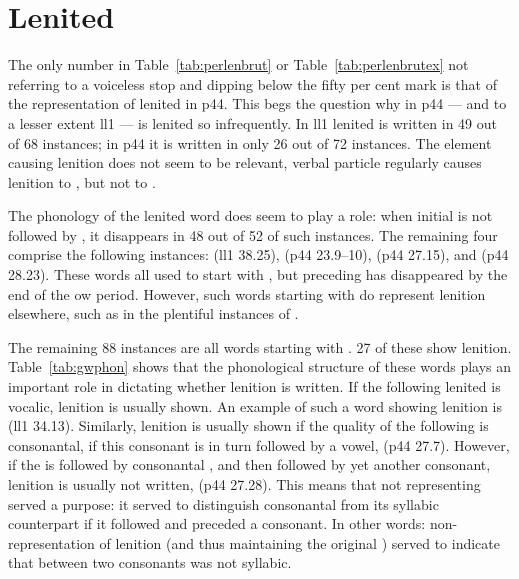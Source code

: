 \section{Lenited }
\label{sec:lenited-mwg}
The only number in Table~\ref{tab:perlenbrut} or Table~\ref{tab:perlenbrutex} not referring to a voiceless stop and dipping below the fifty per cent mark is that of the representation of lenited  in \gls{p44}.
This begs the question why  in \gls{p44} --- and to a lesser
extent \gls{ll1} --- is lenited so infrequently.  In \gls{ll1}
lenited  is written in 49 out of 68 instances; in \gls{p44} it
is written in  only 26 out of 72 instances.  The element causing lenition
does not seem to be relevant, \eg verbal particle  regularly
causes lenition to , but not to .

The phonology of the lenited word does seem to play a role: when
initial  is not followed by , it disappears in 48 out of
52 of such instances. The remaining four comprise the following
instances:  (\gls{ll1} 38.25),
 (\gls{p44} 23.9--10), 
(\gls{p44} 27.15), and  (\gls{p44}
28.23). These words all used to start with , but  \mw{\cw}
preceding  has disappeared by the end of the \gls{ow} period. However, such words
starting with  do represent lenition elsewhere, such as in the
plentiful instances of .

The remaining 88 instances are all words starting with . 27 of these show lenition.
Table~\ref{tab:gwphon} shows that the phonological structure of these words plays an important role in dictating whether lenition is written.
If the  following lenited  is vocalic, lenition is usually shown.
An example of such a word showing lenition is  (\gls{ll1} 34.13).
Similarly, lenition is usually shown if the quality of the following \mw{\cw} is consonantal, if this consonant is in turn followed by a vowel, \eg {} (\gls{p44} 27.7).
However, if the  is followed by consonantal \mw{\cw}, and then followed by yet another consonant, lenition is usually not written, \eg {} (\gls{p44} 27.28).
This means that not representing  served a purpose: it served to distinguish consonantal  from its syllabic counterpart if it followed  and preceded a consonant.
In other words: non-representation of lenition (and thus maintaining the original ) served to indicate that  \mw{\cw} between two consonants was not syllabic.

